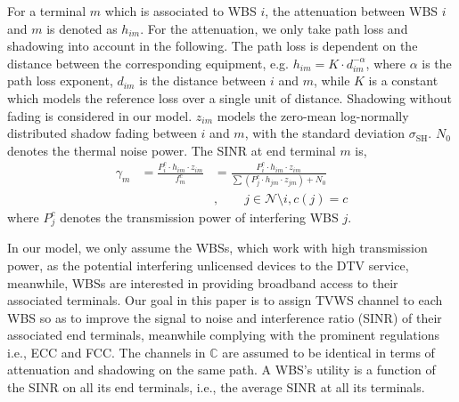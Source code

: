 \documentclass[times]{ettauth}
\newcommand{\ie}{i.e., }
\theoremstyle{mytheoremstyle}
\theoremstyle{mytheoremstyle}
\theoremstyle{mytheoremstyle}
\begin{document}
For a terminal $m$ which is associated to WBS $i$, the attenuation between WBS $i$ and $m$ is denoted as $h_{im}$.
For the attenuation, we only take path loss and shadowing into account in the following.
The path loss is dependent on the distance between the corresponding equipment, e.g. $h_{im}=K \cdot d_{im}^{-\alpha}$, where $\alpha$ is the path loss exponent, $d_{im}$ is the distance between $i$ and $m$, while $K$ is a constant which models the reference loss over a single unit of distance.
Shadowing without fading is considered in our model.
$z_{im}$ models the zero-mean log-normally distributed shadow fading between $i$ and $m$, with the standard deviation $\sigma_{\text{SH}}$.
$N_0$ denotes the thermal noise power.
%
The SINR at end terminal $m$ is,
\begin{equation}
\label{SINR}
\begin{aligned}
\gamma_{m}  & = \frac{P_{i}^c \cdot h_{im}\cdot z_{im}} {f_m^c} & = \frac{P_{i}^c \cdot h_{im}\cdot z_{im}} {\sum (P_{j}^c \cdot h_{jm} \cdot z_{jm}) +  N_0}\\
					& &, \quad \quad j\in \mathcal{N}\setminus i, c(j) = c
\end{aligned}
\end{equation}
where $P_{j}^c$ denotes the transmission power of interfering WBS $j$.



In our model, we only assume the WBSs, which work with high transmission power, as the potential interfering unlicensed devices to the DTV service, meanwhile, WBSs are interested in providing broadband access to their associated terminals.
Our goal in this paper is to assign TVWS channel to each WBS so as to improve the signal to noise and interference ratio (SINR) of their associated end terminals, meanwhile complying with the prominent regulations \ie ECC and FCC.
The channels in $\mathbb{C}$ are assumed to be identical in terms of attenuation and shadowing on the same path.
A WBS's utility is a function of the SINR on all its end terminals, \ie the average SINR at all its terminals.
\end{document}
